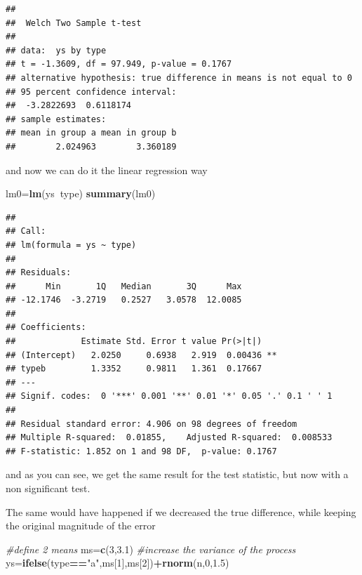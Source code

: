 \documentclass[
]{book}
\newenvironment{Shaded}{\begin{snugshade}}{\end{snugshade}}
\newcommand{\CommentTok}[1]{\textcolor[rgb]{0.56,0.35,0.01}{\textit{#1}}}
\newcommand{\DecValTok}[1]{\textcolor[rgb]{0.00,0.00,0.81}{#1}}
\newcommand{\FloatTok}[1]{\textcolor[rgb]{0.00,0.00,0.81}{#1}}
\newcommand{\KeywordTok}[1]{\textcolor[rgb]{0.13,0.29,0.53}{\textbf{#1}}}
\newcommand{\NormalTok}[1]{#1}
\newcommand{\OperatorTok}[1]{\textcolor[rgb]{0.81,0.36,0.00}{\textbf{#1}}}
\newcommand{\StringTok}[1]{\textcolor[rgb]{0.31,0.60,0.02}{#1}}
\begin{document}
\begin{verbatim}
## 
## 	Welch Two Sample t-test
## 
## data:  ys by type
## t = -1.3609, df = 97.949, p-value = 0.1767
## alternative hypothesis: true difference in means is not equal to 0
## 95 percent confidence interval:
##  -3.2822693  0.6118174
## sample estimates:
## mean in group a mean in group b 
##        2.024963        3.360189
\end{verbatim}

and now we can do it the linear regression way

\begin{Shaded}
\begin{Highlighting}[]
\NormalTok{lm0=}\KeywordTok{lm}\NormalTok{(ys}\OperatorTok{~}\NormalTok{type)}
\KeywordTok{summary}\NormalTok{(lm0)}
\end{Highlighting}
\end{Shaded}

\begin{verbatim}
## 
## Call:
## lm(formula = ys ~ type)
## 
## Residuals:
##      Min       1Q   Median       3Q      Max 
## -12.1746  -3.2719   0.2527   3.0578  12.0085 
## 
## Coefficients:
##             Estimate Std. Error t value Pr(>|t|)   
## (Intercept)   2.0250     0.6938   2.919  0.00436 **
## typeb         1.3352     0.9811   1.361  0.17667   
## ---
## Signif. codes:  0 '***' 0.001 '**' 0.01 '*' 0.05 '.' 0.1 ' ' 1
## 
## Residual standard error: 4.906 on 98 degrees of freedom
## Multiple R-squared:  0.01855,	Adjusted R-squared:  0.008533 
## F-statistic: 1.852 on 1 and 98 DF,  p-value: 0.1767
\end{verbatim}

and as you can see, we get the same result for the test statistic, but now with a non significant test.

The same would have happened if we decreased the true difference, while keeping the original magnitude of the error

\begin{Shaded}
\begin{Highlighting}[]
\CommentTok{#define 2 means}
\NormalTok{ms=}\KeywordTok{c}\NormalTok{(}\DecValTok{3}\NormalTok{,}\FloatTok{3.1}\NormalTok{)}
\CommentTok{#increase the variance of the process}
\NormalTok{ys=}\KeywordTok{ifelse}\NormalTok{(type}\OperatorTok{==}\StringTok{"a"}\NormalTok{,ms[}\DecValTok{1}\NormalTok{],ms[}\DecValTok{2}\NormalTok{])}\OperatorTok{+}\KeywordTok{rnorm}\NormalTok{(n,}\DecValTok{0}\NormalTok{,}\FloatTok{1.5}\NormalTok{)}
\end{Highlighting}
\end{Shaded}
\end{document}
